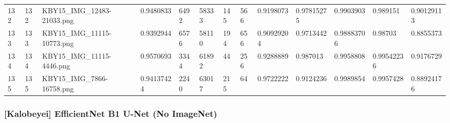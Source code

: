 \documentclass[11pt, a4paper, twoside]{report}
\begin{document}
\begin{longtable}[c]{@{}lllllllllllll@{}}
132 & 132 & KBY15\_IMG\_12483-21033.png & 0.9480833 & 6492 & 58333 & 145 & 566 & 0.9198073 & 0.97815275 & 0.9903903 & 0.989151 & 0.90129113 \\
133 & 133 & KBY15\_IMG\_11115-10773.png & 0.9392944 & 6576 & 58110 & 194 & 656 & 0.90929204 & 0.9713442 & 0.98883706 & 0.98703 & 0.8855373 \\
134 & 134 & KBY15\_IMG\_11115-4446.png & 0.9570693 & 3344 & 61892 & 44 & 256 & 0.9288889 & 0.987013 & 0.9958808 & 0.99542236 & 0.9176729 \\
135 & 135 & KBY15\_IMG\_7866-16758.png & 0.94137424 & 2240 & 63017 & 215 & 64 & 0.9722222 & 0.9124236 & 0.9989854 & 0.9957428 & 0.88924176 \\* \bottomrule
\end{longtable}

\newpage

\subsubsection{[Kalobeyei] EfficientNet B1 U-Net (No ImageNet)}
\end{document}
